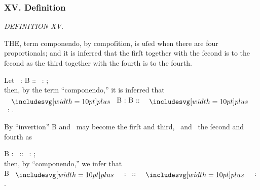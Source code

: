 \documentclass[11pt,preview]{standalone}
\begin{document}
\newcommand{\redA}{{\color{cred}{A}}}
\newcommand{\yellowC}{{\color{cyellow}{C}}}
\newcommand{\blueD}{{\color{cblue}{D}}}

\subsubsection{XV. Definition}

\begin{minipage}{\textwidth}
    \begin{center}
        \textit{DEFINITION XV.}\label{book5def15} \\
    \end{center}

    \hfill
\end{minipage}

\raggedright T\textsc{HE}, term componendo, by compoſition, is uſed when there are four proportionals; and it is inferred that the firſt together with the ſecond is to the ſecond as the third together with the fourth is to the fourth.\\

\hfill

\begin{center}
    Let \redA\ : B :: \yellowC\ : \blueD;\\
    then, by the term “componendo,” it is inferred that\\
    \redA\ $\bplus$ B : B :: \yellowC\ $\bplus$ \blueD\ : \blueD.
\end{center}

\hfill

By “invertion” B and \blueD\ may become the firſt and third, \redA\ and \yellowC\ the ſecond and fourth as\\

\begin{center}
    B : \redA\ :: \blueD\ : \yellowC;\\
    then, by “componendo,” we infer that\\
    B $\bplus$ \redA\ : \redA\ :: \blueD\ $\bplus$ \yellowC\ : \yellowC.
\end{center}
\end{document}
